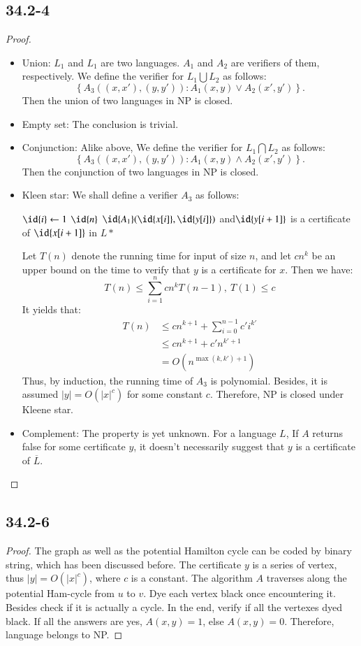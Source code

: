 \documentclass[twocolumn, 10.5pt]{article}
\begin{document}
	\subsection*{34.2-4}
	\begin{proof}
		\begin{itemize}
			\item Union: $L_1$ and $L_1$ are two languages. $A_1$ and $A_2$ are verifiers of them, respectively. We define the verifier for $L_1\bigcup L_2$ as follows: $$\left\{A_3((x,x'),(y,y')):A_1(x,y)\lor A_2(x',y')\right\}.$$ Then the union of two languages in NP is closed.
			\item  Empty set: The conclusion is trivial.
			\item Conjunction: Alike above, We define the verifier for $L_1\bigcap L_2$ as follows: $$\left\{A_3((x,x'),(y,y')):A_1(x,y)\land A_2(x',y')\right\}.$$ Then the conjunction of two languages in NP is closed.
			\item Kleen star:
			We shall define a verifier $A_3$ as follows:
			\begin{codebox}
				\zi {}\li
				\For $\id{i}\gets 1$ \To $\id{n}$\Do\li 
				\If $\id{A_1}(\id{x[i]},\id{y[i]})$ and\zi $\id{y[i+1]}$ is a certificate of $\id{x[i+1]}$ in $L*$\li 
				\Do {}\li
				\Else\li
				\Return {}\End\End\li
				\Return{} 
			\end{codebox}
			Let $T(n)$ denote the
			running time for input of size $n$, and let $cn^k$ be an upper bound on the time to
			verify that $y$ is a certificate for $x$. Then we have:
			\[
			T(n)\le\sum_{i=1}^{n} cn^kT(n-1),\ T(1)\le c
			\]
			It yields that:
			\[
			\begin{aligned}
					T(n)&\le cn^{k+1}+\sum_{i=0}^{n-1}c'i^{k'}\\
					&\le cn^{k+1}+c'n^{k'+1}\\
					&=O\left(n^{\max(k,k')+1}\right)
			\end{aligned}
			\]
			Thus, by induction, the running time of $A_3$ is polynomial. Besides, it is assumed $|y|= O(|x|^c
			)$ for some constant $c$. Therefore, NP is closed under
			Kleene star.
			\item Complement: The property is yet unknown. For a language $L$, If $A$ returns false for some certificate $y$, it doesn't necessarily suggest that $y$ is a certificate of $\overline{L}$.
		\end{itemize}
	\end{proof}
	\subsection*{34.2-6}
	\begin{proof}
		The graph as well as the potential Hamilton cycle can be coded by binary string, which has been discussed before. The certificate $y$ is a series of vertex, thus $|y|=O(|x|^c)$, where $c$ is a constant. The algorithm $A$ traverses along the potential Ham-cycle from $u$ to $v$. Dye each vertex black once encountering it. Besides check if it is actually a cycle. In the end, verify if all the vertexes dyed black. If all the answers are yes, $A(x,y)=1$, else $A(x,y)=0$. Therefore, language  belongs to NP.
	\end{proof}
\end{document}
